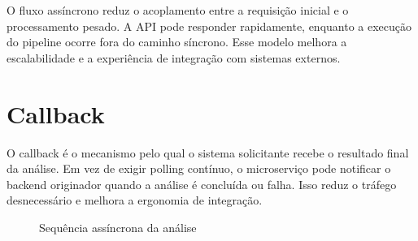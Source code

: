 O fluxo assíncrono reduz o acoplamento entre a requisição inicial e o processamento pesado. A API pode responder rapidamente, enquanto a execução do pipeline ocorre fora do caminho síncrono. Esse modelo melhora a escalabilidade e a experiência de integração com sistemas externos.

\section{Callback}

O callback é o mecanismo pelo qual o sistema solicitante recebe o resultado final da análise. Em vez de exigir polling contínuo, o microserviço pode notificar o backend originador quando a análise é concluída ou falha. Isso reduz o tráfego desnecessário e melhora a ergonomia de integração.

\begin{figure}[H]
    \centering
    \caption{Sequência assíncrona da análise}
    \label{fig:sequencia-mensageria}
\end{figure}
